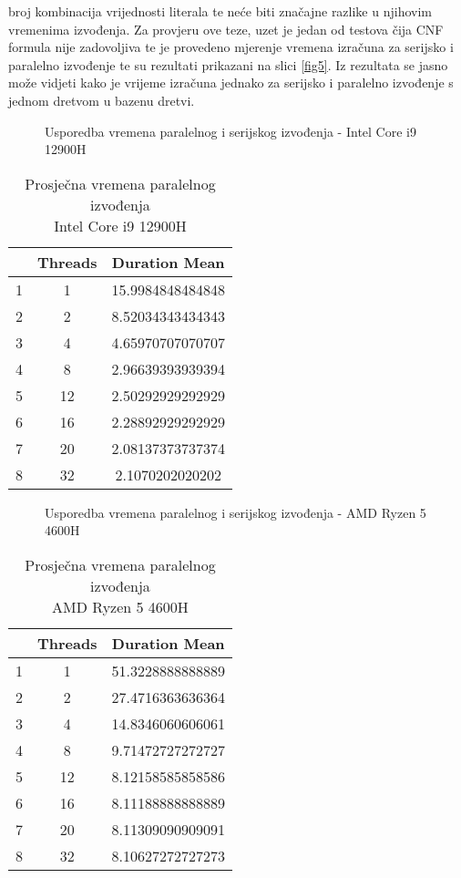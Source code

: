 \documentclass[conference]{IEEEtran}
\begin{document}
broj kombinacija vrijednosti literala te neće biti značajne razlike u njihovim vremenima izvođenja. Za provjeru ove teze, uzet je jedan od testova čija CNF formula nije zadovoljiva te je provedeno mjerenje vremena izračuna za serijsko i paralelno izvođenje te su rezultati prikazani na slici \ref{fig5}. Iz rezultata se jasno može vidjeti kako je vrijeme izračuna jednako za serijsko i paralelno izvođenje s jednom dretvom u bazenu dretvi.


\begin{figure}[ht]
\centerline{}
\caption{Usporedba vremena paralelnog i serijskog izvođenja - Intel Core i9 12900H}
\label{fig1}
\end{figure}

\begin{table}[ht]
\centering
\caption{Prosječna vremena paralelnog izvođenja \\ Intel Core i9 12900H}
\renewcommand{\arraystretch}{1.3}
\begin{tabular}{||c | c | c||} 
 \hline
  & Threads & Duration Mean \\ [0.5ex] 
 \hline \hline
 1&1&15.9984848484848 \\\hline
 2&2&8.52034343434343 \\\hline
 3&4&4.65970707070707 \\\hline
 4&8&2.96639393939394 \\\hline
 5&12&2.50292929292929 \\\hline
 6&16&2.28892929292929 \\\hline
 7&20&2.08137373737374 \\\hline
 8&32&2.1070202020202 \\ \hline
 \hline
\end{tabular}
\label{table:1}
\end{table}

\begin{figure}[ht]
\centerline{}
\caption{Usporedba vremena paralelnog i serijskog izvođenja - AMD Ryzen 5 4600H}
\label{fig2}
\end{figure}


\begin{table}[ht]
\centering
\caption{Prosječna vremena paralelnog izvođenja \\ AMD Ryzen 5 4600H}
\renewcommand{\arraystretch}{1.3}
\begin{tabular}{||c | c | c||} 
 \hline
  & Threads & Duration Mean \\ [0.5ex] 
 \hline \hline
 1&1&51.3228888888889 \\\hline
 2&2&27.4716363636364 \\\hline
 3&4&14.8346060606061 \\\hline
 4&8&9.71472727272727 \\\hline
 5&12&8.12158585858586 \\\hline
 6&16&8.11188888888889 \\\hline
 7&20&8.11309090909091 \\\hline
 8&32&8.10627272727273 \\ \hline
 \hline
\end{tabular}
\label{table:2}
\end{table}
\end{document}
